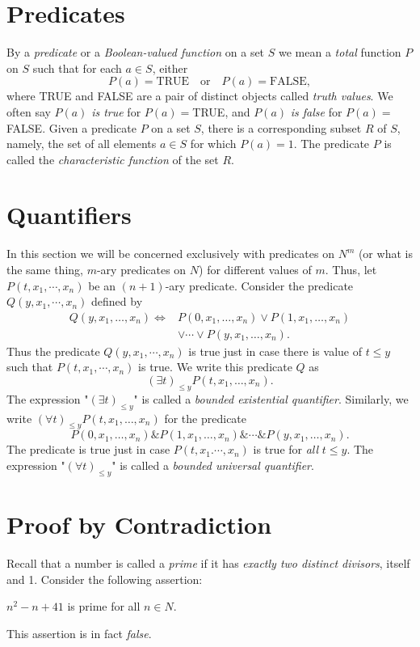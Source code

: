 \documentclass[a4paper,10pt,twoside]{book}
\begin{document}
\section{Predicates}

By a \textit{predicate} or a \textit{Boolean-valued function} on a set $S$ we mean a \textit{total} function $P$ on $S$ such that for each $a\in S$, either $$P(a)=\mathrm{TRUE}\quad\mathrm{or}\quad P(a)=\mathrm{FALSE},$$ where TRUE and FALSE are a pair of distinct objects called \textit{truth values}. We often say $P(a)$ \textit{is true} for $P(a)=$TRUE, and $P(a)$ \textit{is false} for $P(a)=$FALSE. Given a predicate $P$ on a set $S$, there is a corresponding subset $R$ of $S$, namely, the set of all elements $a\in S$ for which $P(a)=1$. The predicate $P$ is called the \textit{characteristic function} of the set $R$.

\section{Quantifiers}

In this section we will be concerned exclusively with predicates on $N^m$ (or what is the same thing, $m$-ary predicates on $N$) for different values of $m$. Thus, let $P(t,x_1,\cdots,x_n)$ be an $(n+1)$-ary predicate. Consider the predicate $Q(y,x_1,\cdots,x_n)$ defined by $$\begin{aligned}Q(y,x_{1},\ldots,x_{n})\Leftrightarrow&P(0,x_{1},\ldots,x_{n})\vee P(1,x_{1},\ldots,x_{n})\\ &\vee\cdots\vee P(y,x_{1},\ldots,x_{n}).\end{aligned}$$ Thus the predicate $Q(y,x_1,\cdots,x_n)$ is true just in case there is value of $t\le y$ such that $P(t,x_1,\cdots,x_n)$ is true. We write this predicate $Q$ as $$(\exists t)_{\leq y}P(t,x_{1},\ldots,x_{n}).$$ The expression "$(\exists t)_{\leq y}$" is called a \textit{bounded existential quantifier}. Similarly, we write $(\forall t)_{\le y}P(t,x_1,\ldots,x_n)$ for the predicate $$P(0,x_1,\ldots,x_n)\&P(1,x_1,\ldots,x_n)\&\cdots\&P(y,x_1,\ldots,x_n).$$ The predicate is true just in case $P(t,x_1.\cdots,x_n)$ is true for \textit{all} $t\le y$. The expression "$(\forall t)_{\le y}$" is called a \textit{bounded universal quantifier}.

\section{Proof by Contradiction}

Recall that a number is called a \textit{prime} if it has \textit{exactly two distinct divisors}, itself and 1. Consider the following assertion:
\begin{center}
    $n^2-n+41$ is prime for all $n\in N$.
\end{center}
This assertion is in fact \textit{false}.
\end{document}
